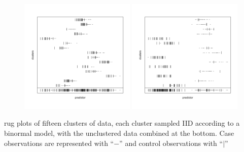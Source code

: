 \documentclass{beamer}
\begin{document}
\begin{frame}
\begin{figure}[!tbp]
  \centering
\includegraphics[width=0.49\textwidth]{220816a.pdf}
\includegraphics[width=0.49\textwidth]{211223b.pdf}
\end{figure}
\small{rug plots of fifteen clusters of data, each cluster sampled IID
    according to a binormal model, with the unclustered
    data combined at the bottom. Case observations are represented with ``$-$'' and
    control observations with ``$|$''}
                                
\end{frame}
\end{document}
